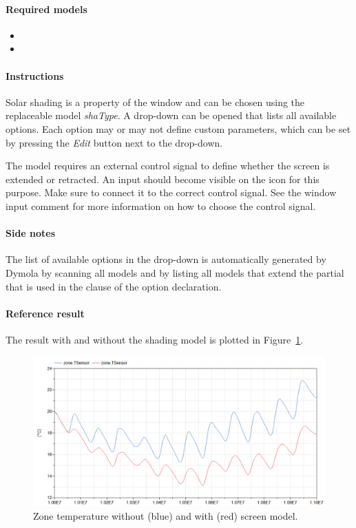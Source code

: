 \documentclass[10pt,a4paper]{article}
\begin{document}
\paragraph{Required models}
\begin{itemize}
\item {}
\item {}
\end{itemize}

\paragraph{Instructions}
Solar shading is a property of the window and can be chosen using the 
replaceable model \textit{shaType}. 
A drop-down can be opened that lists all available options.
Each option may or may not define custom parameters,
which can be set by pressing the \textit{Edit} button next to the drop-down.

The  model requires an external control signal to define
whether the screen is extended or retracted. 
An input should become visible on the  icon for this
purpose. Make sure to connect it to the correct control signal.
See the window input comment for more information on how
to choose the control signal.

\paragraph{Side notes}
The list of available options in the drop-down is automatically generated by
Dymola by scanning all models and by listing all models that extend the partial
that is used in the  clause of the option declaration.

\paragraph{Reference result}
The result with and without the shading model
is plotted in Figure~\ref{fig:res2}.

\begin{figure}[h!]
\centering
\includegraphics[scale=0.65]{Example2.png}
\caption{Zone temperature without (blue) and with (red) screen model.}
\label{fig:res2}
\end{figure}
\end{document}
